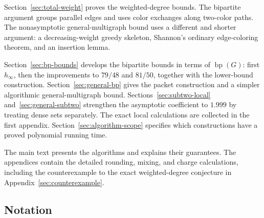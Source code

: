 \documentclass[11pt]{article}
\theoremstyle{definition}\newtheorem{algorithm}{Algorithm}[section]
\numberwithin{equation}{section}
\theoremstyle{remark}\newtheorem*{remark}{Remark}
\newcommand{\bp}{\operatorname{bp}}
\begin{document}
Section~\ref{sec:total-weight} proves the weighted-degree bounds. The
bipartite argument groups parallel edges and uses color exchanges along
two-color paths. The nonasymptotic general-multigraph bound uses a different
and shorter argument: a decreasing-weight greedy skeleton, Shannon's
ordinary edge-coloring theorem, and an insertion lemma.

Section~\ref{sec:bp-bounds} develops the bipartite bounds in terms of
$\bp(G)$: first $h_\infty$, then the improvements to $79/48$ and
$81/50$, together with the lower-bound construction.
Section~\ref{sec:general-bp} gives the packet construction and a
simpler algorithmic general-multigraph bound. Sections~\ref{sec:subtwo-local}
and~\ref{sec:general-subtwo} strengthen the asymptotic coefficient to
$1.999$ by treating dense sets separately. The exact local calculations
are collected in the first appendix. Section~\ref{sec:algorithm-scope}
specifies which constructions have a proved polynomial running time.

The main text presents the algorithms and explains their guarantees.
The appendices contain the detailed rounding, mixing, and charge
calculations, including the counterexample to the exact weighted-degree
conjecture in Appendix~\ref{sec:counterexample}.




\subsection*{Notation}
\end{document}
